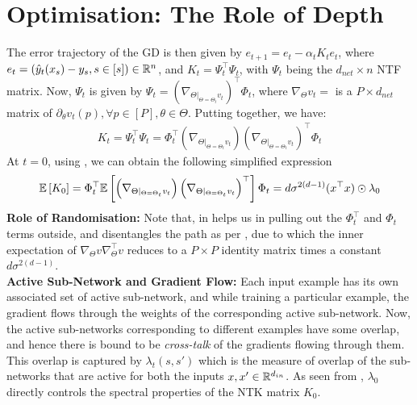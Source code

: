 \section{Optimisation: The Role of Depth}\label{sec:optimisation}

The error trajectory of the GD is then given by $e_{t+1}=e_t-\alpha_t K_te_t$, where $e_t=(\hat{y}_t(x_s)-y_s,s\in[s])\in\mathbb{R}^n$, and $K_t=\Psi^\top_t\Psi_t$, with $\Psi_t$ being the $d_{net}\times n$ NTF matrix. Now, $\Psi_t$ is given by $\Psi_t=\left(\nabla_{\Theta|_{\Theta=\Theta_t}v_t}\right)^\top\Phi_t$, where $\nabla_{\Theta}v_t=$ is a $P\times d_{net}$ matrix of $\partial_{\theta} v_t(p),\forall p\in [P], \theta\in \Theta$. Putting together, we have:
\begin{align*}
K_t=\Psi^\top_t\Psi_t=\Phi^\top_t\left(\nabla_{\Theta|_{\Theta=\Theta_t}v_t}\right)\left(\nabla_{\Theta|_{\Theta=\Theta_t}v_t}\right)^\top\Phi_t
\end{align*}
At $t=0$, using , we can obtain the following simplified expression
\begin{align}\label{eq:opti-refer}
\mathbb{E}\left[K_0\right]=\Phi^\top_t\mathbb{E}\left[\left(\nabla_{\Theta|_{\Theta=\Theta_t}v_t}\right)\left(\nabla_{\Theta|_{\Theta=\Theta_t}v_t}\right)^\top\right]\Phi_t=d\sigma^{2(d-1)}(x^\top x)\odot \lambda_0
\end{align}
\textbf{Role of Randomisation:} Note that, in  helps us in pulling out the $\Phi^\top_t$ and $\Phi_t$ terms outside, and  disentangles the path as per , due to which the inner expectation of $\nabla_{\Theta}v\nabla^\top_{\Theta}v$ reduces to a $P\times P$ identity matrix times a constant $d\sigma^{2(d-1)}$.\\
\textbf{Active Sub-Network and Gradient Flow:}  Each input example has its own associated set of active sub-network, and while training a particular example, the gradient flows through the weights of the corresponding active sub-network. Now, the active sub-networks corresponding to different examples have some overlap, and hence there is bound to be \emph{cross-talk} of the gradients flowing through them. This overlap is captured by $\lambda_t(s,s')$ which is the measure of overlap of the sub-networks that are active for both the inputs $x,x'\in\mathbb{R}^{d_{in}}$. As seen from , $\lambda_0$ directly controls the spectral properties of the NTK matrix $K_0$.\\
